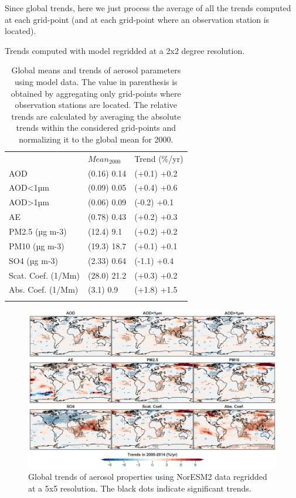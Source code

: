 \documentclass[journal abbreviation, manuscript]{copernicus}
\begin{document}
Since global trends, here we just process the average of all the trends computed at each grid-point (and at each grid-point where an observation station is located).

Trends computed with model regridded at a 2x2 degree resolution.

\begin{table}
 \begin{tabular}{lll}
  \tophline
                     & $Mean_{2000}$ & Trend (\%/yr) \\
  \middlehline
  AOD                & (0.16) 0.14   & (+0.1) +0.2   \\
  AOD<1µm            & (0.09) 0.05   & (+0.4) +0.6   \\
  AOD>1µm            & (0.06) 0.09   & (-0.2) +0.1   \\
  AE                 & (0.78) 0.43   & (+0.2) +0.3   \\
  PM2.5 (µg m-3)     & (12.4) 9.1    & (+0.2) +0.2   \\
  PM10 (µg m-3)      & (19.3) 18.7   & (+0.1) +0.1   \\
  SO4 (µg m-3)       & (2.33) 0.64   & (-1.1) +0.4   \\
  Scat. Coef. (1/Mm) & (28.0) 21.2   & (+0.3) +0.2   \\
  Abs. Coef. (1/Mm)  & (3.1) 0.9     & (+1.8) +1.5   \\
  \bottomhline
 \end{tabular}
 \caption{Global means and trends of aerosol parameters using model data. The value in parenthesis is obtained by aggregating only grid-points where observation stations are located. The relative trends are calculated by averaging the absolute trends within the considered grid-points and normalizing it to the global mean for 2000.}
 \label{mod_tab_trends}
\end{table}

\begin{figure}[t]
 \includegraphics[width=12cm]{../scripts/figs/trends_map.png}
 \caption{Global trends of aerosol properties using NorESM2 data regridded at a 5x5 resolution. The black dots indicate significant trends.}
 \label{mod_map_trends}
\end{figure}
\end{document}
